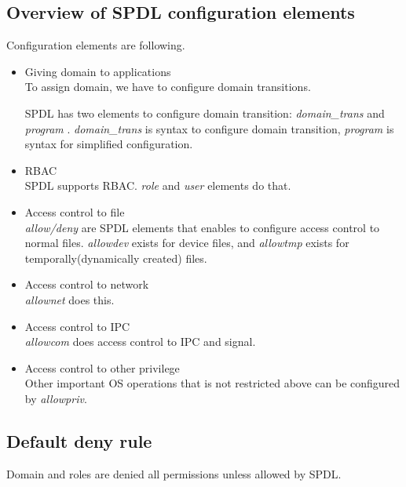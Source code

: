 \documentclass{article}
\begin{document}
\subsection{Overview of SPDL configuration elements}
Configuration elements are following.
\begin{itemize}
 \item Giving domain to applications\\
       To assign domain, we  have to configure domain transitions. 
       
       SPDL has two elements to configure domain transition:  {\it domain\_trans} and  {\it
       program} .
       {\it domain\_trans} is syntax to configure domain transition,
       {\it program} is syntax for simplified configuration.

 \item RBAC\\
       SPDL supports RBAC. {\it role} and {\it user} elements do that.
 \item Access control to file\\       
       {\it allow/deny} are SPDL elements that enables to configure
       access control to normal files. {\it allowdev} exists for device
       files, and {\it allowtmp} exists for temporally(dynamically
       created) files.
 \item Access control to network\\
       {\it allownet} does this.
 \item Access control to IPC\\
       {\it allowcom} does access control to IPC and signal.
 \item Access control to other privilege\\
       Other important OS operations that is not restricted above can be
       configured by {\it allowpriv}.
\end{itemize}

\subsection{Default deny rule}
Domain and roles are denied all permissions unless allowed by SPDL.
\end{document}
